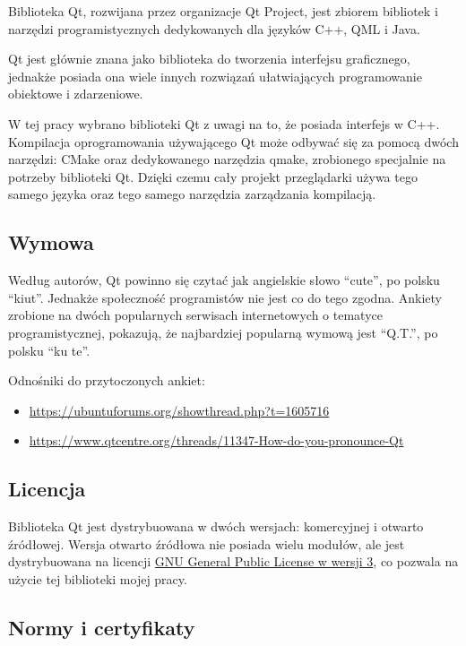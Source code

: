 \par
Biblioteka Qt, rozwijana przez organizacje Qt Project, jest zbiorem bibliotek i narzędzi programistycznych dedykowanych dla języków C++, QML i Java.
\par
Qt jest głównie znana jako biblioteka do tworzenia interfejsu graficznego, jednakże posiada ona wiele innych rozwiązań ułatwiających programowanie obiektowe i zdarzeniowe.
\par
W tej pracy wybrano biblioteki Qt z uwagi na to, że posiada interfejs w C++.
Kompilacja oprogramowania używającego Qt może odbywać się za pomocą dwóch narzędzi: CMake oraz dedykowanego narzędzia qmake, zrobionego specjalnie na potrzeby biblioteki Qt.
Dzięki czemu cały projekt przeglądarki używa tego samego języka oraz tego samego narzędzia zarządzania kompilacją.

\subsection{Wymowa}

\par
Według autorów, Qt powinno się czytać jak angielskie słowo \enquote{cute}, po polsku \enquote{kiut}.
Jednakże społeczność programistów nie jest co do tego zgodna.
Ankiety zrobione na dwóch popularnych serwisach internetowych o tematyce programistycznej, pokazują, że najbardziej popularną wymową jest \enquote{Q.T.}, po polsku \enquote{ku te}.
\par
Odnośniki do przytoczonych ankiet:
\begin{itemize}
    \item \url{https://ubuntuforums.org/showthread.php?t=1605716}
    \item \url{https://www.qtcentre.org/threads/11347-How-do-you-pronounce-Qt}
\end{itemize}

\subsection{Licencja}

\par
Biblioteka Qt jest dystrybuowana w dwóch wersjach: komercyjnej i otwarto źródłowej.
Wersja otwarto źródłowa nie posiada wielu modułów, ale jest dystrybuowana na licencji \href{https://www.gnu.org/licenses/gpl.html}{GNU General Public License w wersji 3}, co pozwala na użycie tej biblioteki mojej pracy.

\subsection{Normy i certyfikaty}

